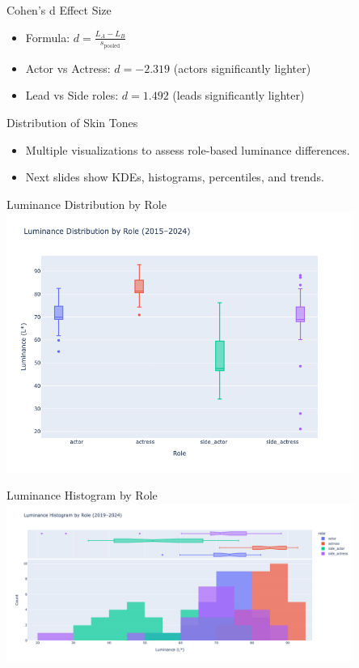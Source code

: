 \documentclass{beamer}
\begin{document}
\begin{frame}{Cohen's d Effect Size}
  \begin{itemize}
    \item Formula: \( d = \frac{L_A - L_B}{s_{\text{pooled}}} \)
    \item Actor vs Actress: \( d = -2.319 \) (actors significantly lighter)
    \item Lead vs Side roles: \( d = 1.492 \) (leads significantly lighter)
  \end{itemize}
\end{frame}

\begin{frame}{Distribution of Skin Tones}
  \begin{itemize}
    \item Multiple visualizations to assess role-based luminance differences.
    \item Next slides show KDEs, histograms, percentiles, and trends.
  \end{itemize}
\end{frame}

\begin{frame}{Luminance Distribution by Role}
  \centering
  \includegraphics[width=0.85\textwidth]{figures/luminance_distribution_by_role.png}
\end{frame}

\begin{frame}{Luminance Histogram by Role}
  \centering
  \includegraphics[width=0.85\textwidth]{figures/luminance_histogram_by_role.png}
\end{frame}
\end{document}
